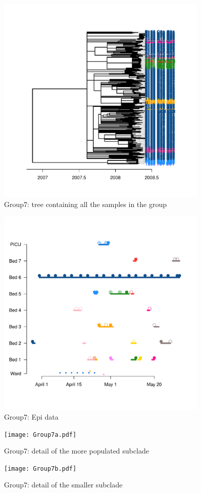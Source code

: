 \documentclass[12pt,a4paper]{article}
\begin{document}
\begin{figure}[!ht]
  \centering
       \includegraphics[width=0.9\textwidth]{group7.pdf}
  \caption{Group7: tree containing all the samples in the group}\label{Group7Tree}
\end{figure}


\begin{figure}[!ht]
  \centering
       \includegraphics[width=0.9\textwidth]{Group7_Beds_2.pdf}
  \caption{Group7: Epi data}\label{Group7Beds}
\end{figure}

\begin{figure}[!ht]
  \centering
       \texttt{[image: Group7a.pdf]}
  \caption{Group7: detail of the more populated subclade }\label{Group7ATree}
\end{figure}

\begin{figure}[!ht]
  \centering
       \texttt{[image: Group7b.pdf]}
  \caption{Group7: detail of the smaller subclade}\label{Group7BTree}
\end{figure}
\end{document}
